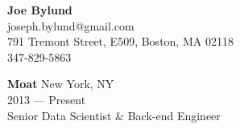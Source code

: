 
\begin{center}
\myfontsize{\bigheader}
\textbf{Joe Bylund}\\
\myfontsize{\bodysize}
joseph.bylund@gmail.com\\
791 Tremont Street, E509, Boston, MA 02118\\
347-829-5863\hspace{3ex}\\
\end{center}

\hrulefill
\vspace{\littleskip}






\myfontsize{\bigheader}
\textbf{Moat}
\myfontsize{\bodysize}
New York, NY\\
2013 --- Present\\
Senior Data Scientist \& Back-end Engineer\\

